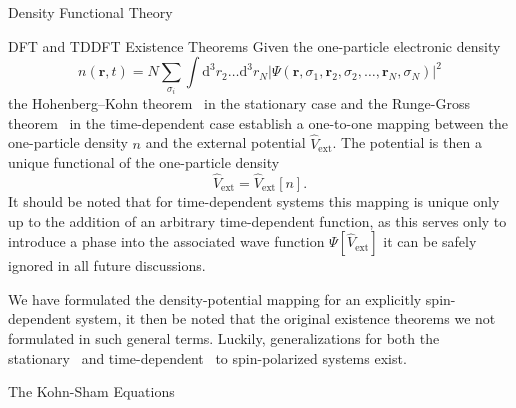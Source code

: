 \documentclass[letterpaper, 12 pt]{report}
\begin{document}
\begin{chapter}{Density Functional Theory \label{chap:dft}}
\begin{section}{DFT and TDDFT Existence Theorems \label{sec:dft}}
      Given the one-particle electronic density
      \begin{equation} \label{eq:dendef1}
         n(\mathbf{r}, t) = N \sum\limits_{\sigma_i} \int \mathrm{d}^3 r_2 \dots \mathrm{d}^3 r_N
                            \left| \Psi(\mathbf{r}, \sigma_1, \mathbf{r}_2, \sigma_2, \dots,
                                   \mathbf{r}_N, \sigma_N) \right|^2
      \end{equation}
      the Hohenberg–Kohn theorem~\cite{hk-theorem} in the stationary case and the Runge-Gross
      theorem~\cite{rgt} in the time-dependent case establish a one-to-one mapping between the
      one-particle density $n$ and the external potential $\hat{V}_\mathrm{ext}$. The potential is
      then a unique functional of the one-particle density
      \begin{equation} \label{eq:vext-func}
         \hat{V}_\mathrm{ext} = \hat{V}_\mathrm{ext} [n].
      \end{equation}
      It should be noted that for time-dependent systems this mapping is unique only up to the addition
      of an arbitrary time-dependent function, as this serves only to introduce a phase into the
      associated wave function $\Psi[\hat{V}_\mathrm{ext}]$ it can be safely ignored in all future
      discussions.

      We have formulated the density-potential mapping for an explicitly spin-dependent system, it
      then be noted that the original existence theorems we not formulated in such general terms.
      Luckily, generalizations for both the stationary~\cite{spin-dep1, spin-dep2} and
      time-dependent~\cite{td-spindep} to spin-polarized systems exist.

   \end{section}

   \begin{section}{The Kohn-Sham Equations \label{sec:ks}}


\end{section}
\end{chapter}
\end{document}
